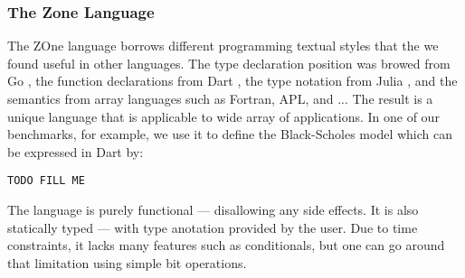 \subsubsection{The Zone Language}


The ZOne language borrows different programming textual styles that
	the we found useful in other languages.
The type declaration position was browed from Go ,
	the function declarations from Dart ,
	the type notation from Julia ,
	and the semantics from array languages such as Fortran, APL,
	and ...
The result is a unique language that is applicable to wide array
	of applications.
In one of our benchmarks, for example, we use it to define the
	Black-Scholes model which can be expressed in Dart by:


\begin{verbatim}
TODO FILL ME
\end{verbatim} 


The language is purely functional --- disallowing any side effects.
It is also statically typed --- with type anotation provided by the user.
Due to time constraints, it lacks many features such as conditionals, but 
	one can go around that limitation using simple bit operations.
